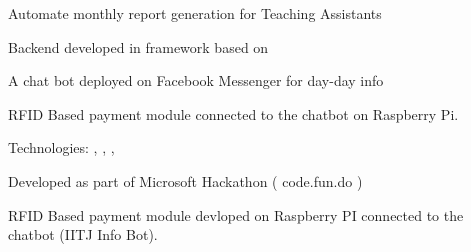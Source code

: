 \documentclass[]{deedy-resume-openfont}
\begin{document}
\begin{minipage}[t]{0.67\textwidth}
\begin{tightemize}
    
\end{tightemize}

\begin{tightemize}
\item Automate monthly report generation for Teaching Assistants
\item Backend developed in  framework based on 
\end{tightemize}

\begin{tightemize}
\item A chat bot deployed on Facebook Messenger for day-day info
\item RFID Based payment module connected to the chatbot on Raspberry Pi.
\item Technologies:  ,  , , 
\item Developed as part of Microsoft Hackathon ( code.fun.do ) 
\end{tightemize}

\begin{tightemize}
\item RFID Based payment module devloped on Raspberry PI connected to the chatbot (IITJ Info Bot).
\end{tightemize}





\end{minipage}
\end{document}
